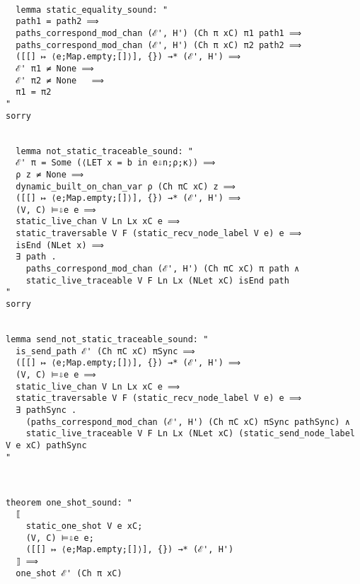 \documentclass{article}
\begin{document}
\begin{lstlisting}[style=codestyle1, escapechar=\%]

  lemma static_equality_sound: "
  path1 = path2 ⟹
  paths_correspond_mod_chan (ℰ', H') (Ch π xC) π1 path1 ⟹
  paths_correspond_mod_chan (ℰ', H') (Ch π xC) π2 path2 ⟹
  ([[] ↦ ⟨e;Map.empty;[]⟩], {}) →* (ℰ', H') ⟹ 
  ℰ' π1 ≠ None ⟹ 
  ℰ' π2 ≠ None   ⟹ 
  π1 = π2
"
sorry


  lemma not_static_traceable_sound: "
  ℰ' π = Some (⟨LET x = b in e⇩n;ρ;κ⟩) ⟹
  ρ z ≠ None ⟹
  dynamic_built_on_chan_var ρ (Ch πC xC) z ⟹
  ([[] ↦ ⟨e;Map.empty;[]⟩], {}) →* (ℰ', H') ⟹ 
  (V, C) ⊨⇩e e ⟹
  static_live_chan V Ln Lx xC e ⟹
  static_traversable V F (static_recv_node_label V e) e ⟹
  isEnd (NLet x) ⟹
  ∃ path . 
    paths_correspond_mod_chan (ℰ', H') (Ch πC xC) π path ∧
    static_live_traceable V F Ln Lx (NLet xC) isEnd path
"
sorry


lemma send_not_static_traceable_sound: "
  is_send_path ℰ' (Ch πC xC) πSync ⟹
  ([[] ↦ ⟨e;Map.empty;[]⟩], {}) →* (ℰ', H') ⟹ 
  (V, C) ⊨⇩e e ⟹
  static_live_chan V Ln Lx xC e ⟹
  static_traversable V F (static_recv_node_label V e) e ⟹
  ∃ pathSync .
    (paths_correspond_mod_chan (ℰ', H') (Ch πC xC) πSync pathSync) ∧ 
    static_live_traceable V F Ln Lx (NLet xC) (static_send_node_label V e xC) pathSync
"
  \end{lstlisting}


\begin{lstlisting}[style=codestyle1, escapechar=\%]


theorem one_shot_sound: "
  ⟦
    static_one_shot V e xC;
    (V, C) ⊨⇩e e;
    ([[] ↦ ⟨e;Map.empty;[]⟩], {}) →* (ℰ', H')
  ⟧ ⟹
  one_shot ℰ' (Ch π xC)

  \end{lstlisting}


\begin{lstlisting}[style=codestyle1, escapechar=\%]
  \end{lstlisting}


\begin{lstlisting}[style=codestyle1, escapechar=\%]
  \end{lstlisting}


\begin{lstlisting}[style=codestyle1, escapechar=\%]
  \end{lstlisting}


\begin{lstlisting}[style=codestyle1, escapechar=\%]

  \end{lstlisting}
\end{document}
